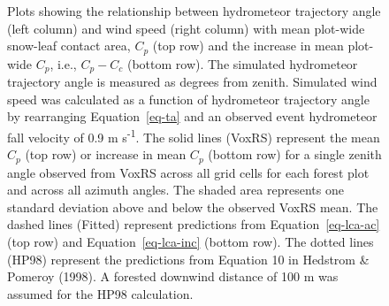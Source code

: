 \documentclass[
  letterpaper,
  DIV=11,
  numbers=noendperiod]{scrartcl}
\begin{document}
\begin{figure}[H]


\caption{\label{fig-lca-ht-ws}Plots showing the relationship between
hydrometeor trajectory angle (left column) and wind speed (right column)
with mean plot-wide snow-leaf contact area, \(C_p\) (top row) and the
increase in mean plot-wide \(C_p\), i.e., \(C_p - C_c\) (bottom row).
The simulated hydrometeor trajectory angle is measured as degrees from
zenith. Simulated wind speed was calculated as a function of hydrometeor
trajectory angle by rearranging Equation~\ref{eq-ta} and an observed
event hydrometeor fall velocity of 0.9 m s\textsuperscript{-1}. The
solid lines (VoxRS) represent the mean \(C_p\) (top row) or increase in
mean \(C_p\) (bottom row) for a single zenith angle observed from VoxRS
across all grid cells for each forest plot and across all azimuth
angles. The shaded area represents one standard deviation above and
below the observed VoxRS mean. The dashed lines (Fitted) represent
predictions from Equation~\ref{eq-lca-ac} (top row) and
Equation~\ref{eq-lca-inc} (bottom row). The dotted lines (HP98)
represent the predictions from Equation 10 in Hedstrom \& Pomeroy
(1998). A forested downwind distance of 100 m was assumed for the HP98
calculation.}

\end{figure}%
\end{document}
